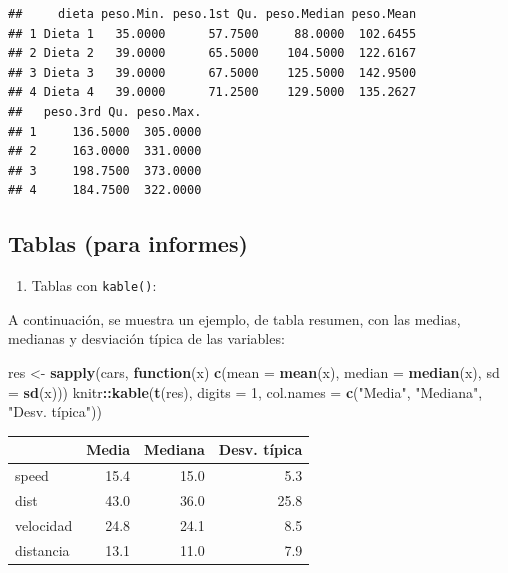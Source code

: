 \documentclass[
]{book}
\newenvironment{Shaded}{\begin{snugshade}}{\end{snugshade}}
\newcommand{\AttributeTok}[1]{\textcolor[rgb]{0.13,0.29,0.53}{#1}}
\newcommand{\ControlFlowTok}[1]{\textcolor[rgb]{0.13,0.29,0.53}{\textbf{#1}}}
\newcommand{\DecValTok}[1]{\textcolor[rgb]{0.00,0.00,0.81}{#1}}
\newcommand{\FunctionTok}[1]{\textcolor[rgb]{0.13,0.29,0.53}{\textbf{#1}}}
\newcommand{\NormalTok}[1]{#1}
\newcommand{\OtherTok}[1]{\textcolor[rgb]{0.56,0.35,0.01}{#1}}
\newcommand{\SpecialCharTok}[1]{\textcolor[rgb]{0.81,0.36,0.00}{\textbf{#1}}}
\newcommand{\StringTok}[1]{\textcolor[rgb]{0.31,0.60,0.02}{#1}}
\providecommand{\tightlist}{%
  \setlength{\itemsep}{0pt}\setlength{\parskip}{0pt}}
\begin{document}
\begin{verbatim}
##     dieta peso.Min. peso.1st Qu. peso.Median peso.Mean
## 1 Dieta 1   35.0000      57.7500     88.0000  102.6455
## 2 Dieta 2   39.0000      65.5000    104.5000  122.6167
## 3 Dieta 3   39.0000      67.5000    125.5000  142.9500
## 4 Dieta 4   39.0000      71.2500    129.5000  135.2627
##   peso.3rd Qu. peso.Max.
## 1     136.5000  305.0000
## 2     163.0000  331.0000
## 3     198.7500  373.0000
## 4     184.7500  322.0000
\end{verbatim}

\subsection{Tablas (para informes)}\label{tablas-para-informes}

\begin{enumerate}
\def\labelenumi{\alph{enumi}.}
\tightlist
\item
  Tablas con \texttt{kable()}:
\end{enumerate}

A continuación, se muestra un ejemplo, de tabla resumen, con las medias, medianas y desviación típica de las variables:

\begin{Shaded}
\begin{Highlighting}[]
\NormalTok{res }\OtherTok{\textless{}{-}} \FunctionTok{sapply}\NormalTok{(cars, }
          \ControlFlowTok{function}\NormalTok{(x) }\FunctionTok{c}\NormalTok{(}\AttributeTok{mean =} \FunctionTok{mean}\NormalTok{(x), }
                        \AttributeTok{median =} \FunctionTok{median}\NormalTok{(x), }
                        \AttributeTok{sd =} \FunctionTok{sd}\NormalTok{(x)))}
\NormalTok{knitr}\SpecialCharTok{::}\FunctionTok{kable}\NormalTok{(}\FunctionTok{t}\NormalTok{(res), }\AttributeTok{digits =} \DecValTok{1}\NormalTok{, }
             \AttributeTok{col.names =} \FunctionTok{c}\NormalTok{(}\StringTok{"Media"}\NormalTok{, }\StringTok{"Mediana"}\NormalTok{, }\StringTok{"Desv. típica"}\NormalTok{))}
\end{Highlighting}
\end{Shaded}

\begin{tabular}{l|r|r|r}
\hline
  & Media & Mediana & Desv. típica\\
\hline
speed & 15.4 & 15.0 & 5.3\\
\hline
dist & 43.0 & 36.0 & 25.8\\
\hline
velocidad & 24.8 & 24.1 & 8.5\\
\hline
distancia & 13.1 & 11.0 & 7.9\\
\hline
\end{tabular}
\end{document}

